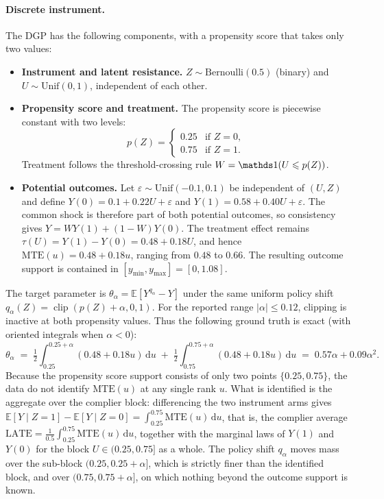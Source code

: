 \paragraph{Discrete instrument.}
The DGP has the following components, with a propensity score that takes only two values:
\begin{itemize}
    \item \textbf{Instrument and latent resistance.} $Z \sim \text{Bernoulli}(0.5)$ (binary) and $U \sim \text{Unif}(0,1)$, independent of each other.

    \item \textbf{Propensity score and treatment.} The propensity score is piecewise constant with two levels:
    \[
        p(Z) = \begin{cases} 0.25 & \text{if } Z = 0, \\ 0.75 & \text{if } Z = 1. \end{cases}
    \]
    Treatment follows the threshold-crossing rule $W = \indicator(U \leqslant p(Z))$.

    \item \textbf{Potential outcomes.} Let $\varepsilon \sim \text{Unif}(-0.1, 0.1)$ be independent of $(U,Z)$ and define $Y(0) = 0.1 + 0.22U+\varepsilon$ and $Y(1) = 0.58 + 0.40U+\varepsilon$. The common shock is therefore part of both potential outcomes, so consistency gives $Y=WY(1)+(1-W)Y(0)$. The treatment effect remains $\tau(U)=Y(1)-Y(0)=0.48+0.18U$, and hence $\text{MTE}(u)=0.48+0.18u$, ranging from $0.48$ to $0.66$. The resulting outcome support is contained in $[y_{\min},y_{\max}]=[0,1.08]$.
\end{itemize}

\noindent The target parameter is $\theta_\alpha = \mathbb{E}[Y^{q_\alpha} - Y]$ under the same uniform policy shift $q_\alpha(Z) = \operatorname{clip}(p(Z)+\alpha, 0, 1)$. For the reported range $|\alpha|\leqslant0.12$, clipping is inactive at both propensity values. Thus the following ground truth is exact (with oriented integrals when $\alpha<0$):
\[
    \theta_\alpha \;=\; \tfrac{1}{2}\int_{0.25}^{0.25+\alpha}(0.48+0.18u)\,\mathrm{d}u \;+\; \tfrac{1}{2}\int_{0.75}^{0.75+\alpha}(0.48+0.18u)\,\mathrm{d}u \;=\; 0.57\alpha+0.09\alpha^2.
\]
Because the propensity score support consists of only two points $\{0.25, 0.75\}$, the data do not identify $\text{MTE}(u)$ at any single rank $u$. What is identified is the aggregate over the complier block: differencing the two instrument arms gives $\mathbb{E}[Y\mid Z=1]-\mathbb{E}[Y\mid Z=0]=\int_{0.25}^{0.75}\text{MTE}(u)\,\mathrm{d}u$, that is, the complier average $\text{LATE}=\tfrac{1}{0.5}\int_{0.25}^{0.75}\text{MTE}(u)\,\mathrm{d}u$, together with the marginal laws of $Y(1)$ and $Y(0)$ for the block $U\in(0.25,0.75]$ as a whole. The policy shift $q_\alpha$ moves mass over the sub-block $(0.25,0.25+\alpha]$, which is strictly finer than the identified block, and over $(0.75,0.75+\alpha]$, on which nothing beyond the outcome support is known. 

